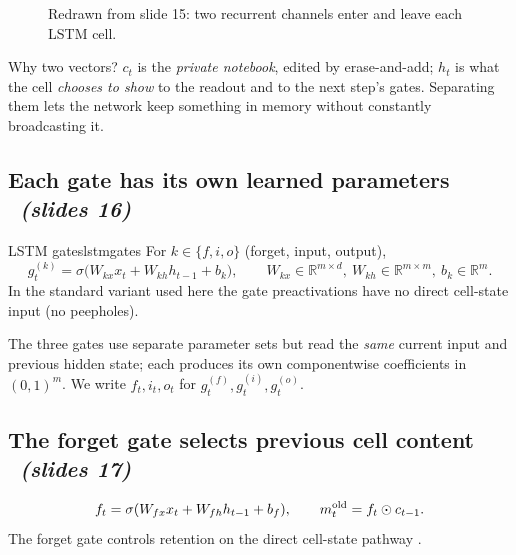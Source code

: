 \documentclass[11pt,a4paper]{article}
\newcommand{\R}{\mathbb{R}}
\newcommand{\sltag}[1]{\texorpdfstring{\ \emph{(slides #1)}}{ (slides #1)}}
\begin{document}
\begin{figure}[H]\centering
{}
\caption{Redrawn from slide 15: two recurrent channels enter and leave each LSTM cell.}
\end{figure}

\begin{intuition}
Why two vectors? $c_t$ is the \emph{private notebook}, edited by erase-and-add; $h_t$ is what the cell \emph{chooses to show} to the readout and to the next step's gates. Separating them lets the network keep something in memory without constantly broadcasting it.
\end{intuition}

\subsection{Each gate has its own learned parameters \sltag{16}}

\begin{definition}{LSTM gates}{lstmgates}
For $k\in\{f,i,o\}$ (forget, input, output),
\[
g_t^{(k)}=\sigma\big(W_{kx}x_t+W_{kh}h_{t-1}+b_k\big),\qquad W_{kx}\in\R^{m\times d},\ W_{kh}\in\R^{m\times m},\ b_k\in\R^m .
\]
In the standard variant used here the gate preactivations have no direct cell-state input (no peepholes).
\end{definition}

The three gates use separate parameter sets but read the \emph{same} current input and previous hidden state; each produces its own componentwise coefficients in $(0,1)^m$. We write $f_t,i_t,o_t$ for $g_t^{(f)},g_t^{(i)},g_t^{(o)}$.

\subsection{The forget gate selects previous cell content \sltag{17}}

\[
f_t=\sigma(W_{fx}x_t+W_{fh}h_{t-1}+b_f),\qquad m_t^{\rm old}=f_t\odot c_{t-1}.
\]
The forget gate controls retention on the direct cell-state pathway \cite{r6}.
\end{document}
